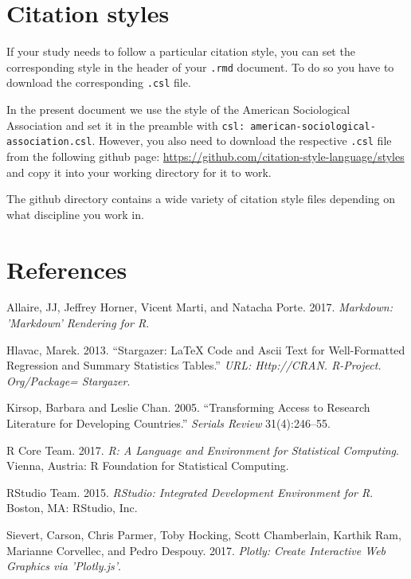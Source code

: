 \documentclass[
  12pt,
]{article}
\begin{document}
\hypertarget{citation-styles}{%
\section{Citation styles}\label{citation-styles}}

If your study needs to follow a particular citation style, you can set the corresponding style in the header of your \texttt{.rmd} document. To do so you have to download the corresponding \texttt{.csl} file.

In the present document we use the style of the American Sociological Association and set it in the preamble with \texttt{csl:\ american-sociological-association.csl}. However, you also need to download the respective \texttt{.csl} file from the following github page: \url{https://github.com/citation-style-language/styles} and copy it into your working directory for it to work.

The github directory contains a wide variety of citation style files depending on what discipline you work in.

\hypertarget{references}{%
\section{References}\label{references}}

\linespread{1}

\hypertarget{refs}{}
\leavevmode\hypertarget{ref-markdown2017}{}%
Allaire, JJ, Jeffrey Horner, Vicent Marti, and Natacha Porte. 2017. \emph{Markdown: 'Markdown' Rendering for R}.

\leavevmode\hypertarget{ref-hlavac2013stargazer}{}%
Hlavac, Marek. 2013. ``Stargazer: LaTeX Code and Ascii Text for Well-Formatted Regression and Summary Statistics Tables.'' \emph{URL: Http://CRAN. R-Project. Org/Package= Stargazer}.

\leavevmode\hypertarget{ref-Kirsop2005-ro}{}%
Kirsop, Barbara and Leslie Chan. 2005. ``Transforming Access to Research Literature for Developing Countries.'' \emph{Serials Review} 31(4):246--55.

\leavevmode\hypertarget{ref-R2017}{}%
R Core Team. 2017. \emph{R: A Language and Environment for Statistical Computing}. Vienna, Austria: R Foundation for Statistical Computing.

\leavevmode\hypertarget{ref-Rstudio2015}{}%
RStudio Team. 2015. \emph{RStudio: Integrated Development Environment for R}. Boston, MA: RStudio, Inc.

\leavevmode\hypertarget{ref-plotly}{}%
Sievert, Carson, Chris Parmer, Toby Hocking, Scott Chamberlain, Karthik Ram, Marianne Corvellec, and Pedro Despouy. 2017. \emph{Plotly: Create Interactive Web Graphics via 'Plotly.js'}.
\end{document}
